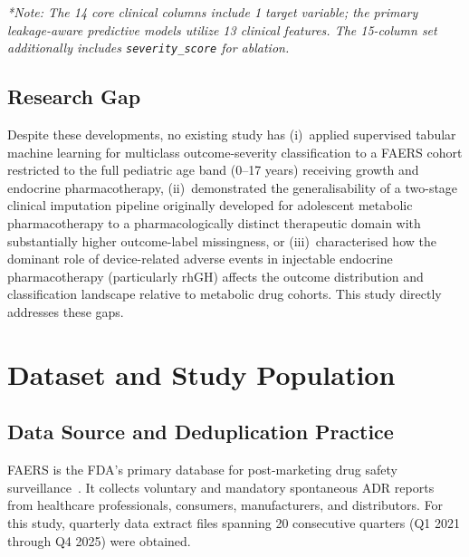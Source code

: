 \documentclass[10pt,twocolumn]{article}
\newcommand{\FAERS}{\textsf{FAERS}\xspace}
\begin{document}
\begin{table}[t]
\smallskip
\noindent\footnotesize\textit{*Note: The 14 core clinical columns include 1 target variable; the primary leakage-aware predictive models utilize 13 clinical features. The 15-column set additionally includes \texttt{severity\_score} for ablation.}
\end{table}
 
\subsection{Research Gap}
Despite these developments, no existing study has (i)~applied supervised tabular machine learning for multiclass outcome-severity classification to a \FAERS cohort restricted to the full pediatric age band (0--17 years) receiving growth and endocrine pharmacotherapy, (ii)~demonstrated the generalisability of a two-stage clinical imputation pipeline originally developed for adolescent metabolic pharmacotherapy to a pharmacologically distinct therapeutic domain with substantially higher outcome-label missingness, or (iii)~characterised how the dominant role of device-related adverse events in injectable endocrine pharmacotherapy (particularly rhGH) affects the outcome distribution and classification landscape relative to metabolic drug cohorts. This study directly addresses these gaps.
 
\section{Dataset and Study Population}
 
\subsection{Data Source and Deduplication Practice}
\FAERS is the FDA's primary database for post-marketing drug safety surveillance~\cite{fda2026}. It collects voluntary and mandatory spontaneous ADR reports from healthcare professionals, consumers, manufacturers, and distributors. For this study, quarterly data extract files spanning 20 consecutive quarters (Q1 2021 through Q4 2025) were obtained.
 
\end{document}
